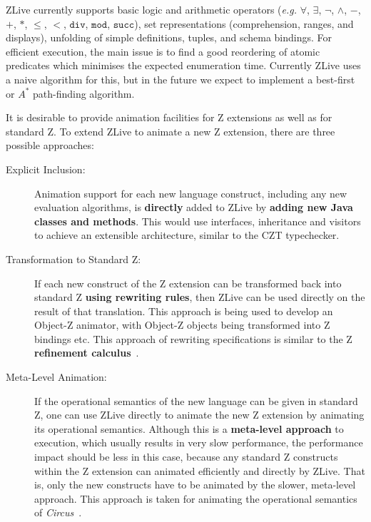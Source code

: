 \documentclass{llncs}
\newcommand{\Circus}{{\sf\slshape Circus}}
\begin{document}
    ZLive currently supports basic logic and arithmetic operators
    (\textit{e.g.} $\forall$, $\exists$, $\lnot$, $\land$, $-$,
    $+$, $*$, $\leq$, $<$, $\mathtt{div}$, $\mathtt{mod}$, $\mathtt{succ}$),
    set representations (comprehension, ranges, and displays), unfolding
    of simple definitions, tuples, and schema bindings.
    For efficient execution, the main issue is to find a good reordering
    of atomic predicates which minimises the expected enumeration time.
    Currently ZLive uses a naive algorithm for this, but in the future we
    expect to implement a best-first or $A^{*}$ path-finding algorithm.

    It is desirable to provide animation facilities for Z extensions
    as well as for standard Z.  To extend ZLive to animate a new Z
    extension, there are three possible approaches:
    \begin{description}

      \item[Explicit Inclusion:] Animation support for each new
      language construct, including any new evaluation algorithms, is
      \textbf{directly} added to ZLive by \textbf{add\-ing new Java
      classes and methods}.  This would use interfaces, inheritance
      and visitors to achieve an extensible architecture, similar to
      the CZT typechecker.

      \item[Transformation to Standard Z:] If each new construct of
      the Z extension can be transformed back into standard Z
      \textbf{using rewriting rules}, then ZLive can be used directly
      on the result of that translation.
      This approach is being used to develop an Object-Z
      animator, with Object-Z objects being
      transformed into Z bindings etc.  This approach of
      rewriting specifications is similar to the Z \textbf{refinement
      calculus}~\cite{z.others:ana.phd,fm.ref:morgan}.

      \item[Meta-Level Animation:] If the operational semantics of
      the new language can be given in standard Z, one can use ZLive
      directly to animate the new Z extension by animating its
      operational semantics.  Although this is a \textbf{meta-level
      approach} to execution, which usually results in very slow
      performance, the performance impact should be less in this case,
      because any standard Z constructs within the Z extension can
      animated efficiently and directly by ZLive.  That is, only the
      new constructs have to be animated by the slower, meta-level
      approach.  This approach is taken for animating the operational
      semantics of \Circus~\cite{circus.mc:opsem}.

    \end{description}
\end{document}
